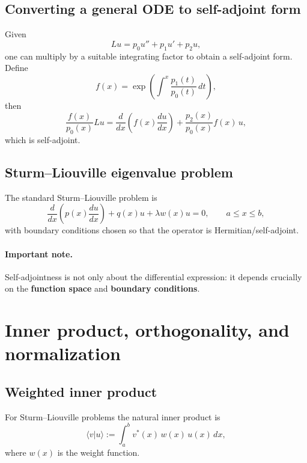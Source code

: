 \subsection{Converting a general ODE to self-adjoint form}
Given
\begin{equation}
Lu = p_0u'' + p_1u' + p_2u,
\end{equation}
one can multiply by a suitable integrating factor to obtain a self-adjoint form.
Define
\begin{equation}
f(x) = \exp\!\left(\int^x \frac{p_1(t)}{p_0(t)}\,dt\right),
\end{equation}
then
\begin{equation}
\frac{f(x)}{p_0(x)}Lu
=
\frac{d}{dx}\!\left(f(x)\frac{du}{dx}\right)
+
\frac{p_2(x)}{p_0(x)}f(x)\,u,
\end{equation}
which is self-adjoint.

\subsection{Sturm--Liouville eigenvalue problem}
The standard Sturm--Liouville problem is
\begin{equation}
\frac{d}{dx}\!\left(p(x)\frac{du}{dx}\right) + q(x)u + \lambda w(x)u = 0,
\qquad a\le x\le b,
\end{equation}
with boundary conditions chosen so that the operator is Hermitian/self-adjoint.

\paragraph{Important note.}
Self-adjointness is not only about the differential expression:
it depends crucially on the \textbf{function space} and \textbf{boundary conditions}.


\section{Inner product, orthogonality, and normalization}

\subsection{Weighted inner product}
For Sturm--Liouville problems the natural inner product is
\begin{equation}
\langle v|u\rangle := \int_a^b v^*(x)\,w(x)\,u(x)\,dx,
\end{equation}
where $w(x)$ is the weight function.

